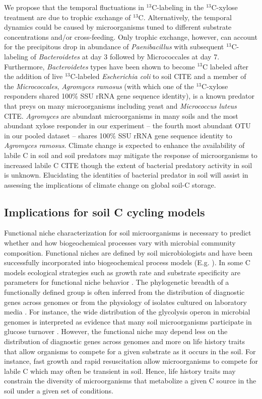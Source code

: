 We propose that the temporal fluctuations in $^{13}$C-labeling in the
$^{13}$C-xylose treatment are due to trophic exchange of $^{13}$C.
Alternatively, the temporal dynamics could be caused by microorganisms tuned to
different substrate concentrations and/or cross-feeding. Only trophic exchange,
however, can account for the precipitous drop in abundance of
\textit{Paenibacillus} with subsequent $^{13}$C-labeling of \textit{Bacteroidetes} at
day 3 followed by Micrococcales at day 7.  Furthermore, \textit{Bacteroidetes} types
have been shown to become $^{13}$C labeled after the addition of live
$^{13}$C-labeled \textit{Escherichia coli} to soil CITE and a member of the
\textit{Micrococcales}, \textit{Agromyces ramosus} (with which one of the $^{13}$C-xylose
responders shared 100\% SSU rRNA gene sequence identity), is a known predator
that preys on many microorganisms including yeast and \textit{Micrococcus
luteus} CITE. \textit{Agromyces} are abundant microorganisms in many soils and
the most abundant xylose responder in our experiment -- the fourth most abundant OTU in our pooled
dataset -- shares 100\% SSU rRNA gene sequence identity to \textit{Agromyces
ramosus}. Climate change is expected to enhance the availability of
labile C in soil and soil predators may mitigate the response of microorganisms
to increased labile C CITE though the extent of bacterial predatory 
activity in soil is unknown. Elucidating the identities of bacterial
predator in soil will assist in assessing the implications of climate change
on global soil-C storage.

\subsection{Implications for soil C cycling models}
Functional niche characterization for soil microorganisms is necessary to
predict whether and how biogeochemical processes vary with microbial community
composition. Functional niches are defined by soil microbiologists and have
been successfully incorporated into biogeochemical process models (E.g.
\citep{wieder_2014a,Kaiser2014a}). In some C models ecological strategies such
as growth rate and substrate specificity are parameters for functional niche
behavior \citep{Kaiser2014a}. The phylogenetic breadth of a functionally
defined group is often inferred from the distribution of diagnostic genes
across genomes \citep{Berlemont2013} or from the physiology of isolates
cultured on laboratory media \citep{Martiny2013}. For instance, the wide
distribution of the glycolysis operon in microbial genomes is interpreted
as evidence that many soil microorganisms participate in glucose turnover
\citep{McGuire2010}. However, the functional niche may depend less on the
distribution of diagnostic genes across genomes and more on life history
traits that allow organisms to compete for a given substrate as it occurs
in the soil. For instance, fast growth and rapid resuscitation allow
microorganisms to compete for labile C which may often be transient in
soil. Hence, life history traits may constrain the diversity of microorganisms
that metabolize a given C source in the soil under a given set of
conditions.

